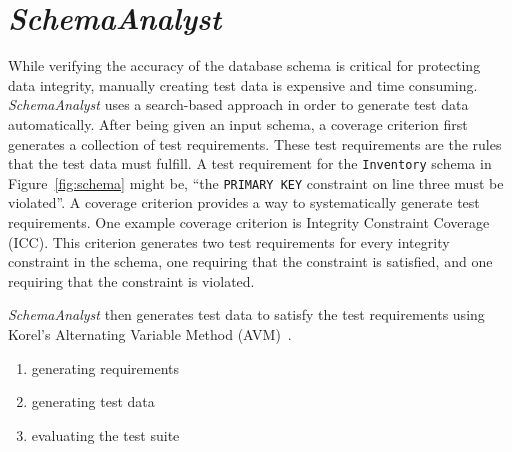 \section{\textit{SchemaAnalyst}}

While verifying the accuracy of the database schema is critical for protecting data integrity, manually
creating test data is expensive and time consuming. \textit{SchemaAnalyst} uses a search-based
approach in order to generate test data automatically. After being given an input schema, a coverage
criterion first generates a collection of test requirements. These test requirements are the rules that
the test data must fulfill. A test requirement for the \texttt{Inventory} schema in
Figure~\ref{fig:schema} might be, ``the \texttt{PRIMARY KEY} constraint on line three must be
violated''. A coverage criterion provides a way to systematically generate test requirements. One
example coverage criterion is Integrity Constraint Coverage (ICC). This criterion generates two test
requirements for every integrity constraint in the schema, one requiring that the constraint is
satisfied, and one requiring that the constraint is violated.

\textit{SchemaAnalyst} then generates test data
to satisfy the test requirements using Korel's Alternating Variable Method (AVM)~\cite{Korel:AVM}.

\begin{enumerate}
\item generating requirements
\item generating test data
\item evaluating the test suite
\end{enumerate}


